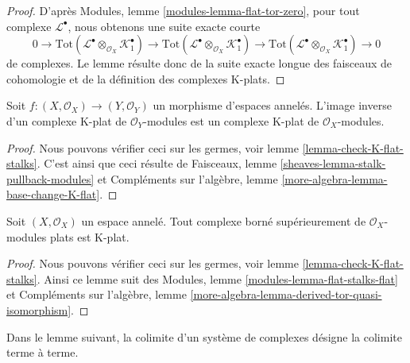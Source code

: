 {\begin{proof}
D'après Modules, lemme \ref{modules-lemma-flat-tor-zero}, pour tout complexe $\mathcal{L}^\bullet$, nous obtenons une suite exacte courte $$
0 \to
\text{Tot}(\mathcal{L}^\bullet \otimes_{\mathcal{O}_X} \mathcal{K}_1^\bullet)
\to
\text{Tot}(\mathcal{L}^\bullet \otimes_{\mathcal{O}_X} \mathcal{K}_1^\bullet)
\to
\text{Tot}(\mathcal{L}^\bullet \otimes_{\mathcal{O}_X} \mathcal{K}_1^\bullet)
\to 0
$$ de complexes. Le lemme résulte donc de la suite exacte longue des faisceaux de cohomologie et de la définition des complexes K-plats.
\end{proof}

\begin{lemma}

\label{lemma-pullback-K-flat}

Soit $f : (X, \mathcal{O}_X) \to (Y, \mathcal{O}_Y)$ un morphisme d'espaces annelés. L'image inverse d'un complexe K-plat de $\mathcal{O}_Y$-modules est un complexe K-plat de $\mathcal{O}_X$-modules.

\end{lemma}

\begin{proof}
Nous pouvons vérifier ceci sur les germes, voir lemme \ref{lemma-check-K-flat-stalks}. C'est ainsi que ceci résulte de Faisceaux, lemme \ref{sheaves-lemma-stalk-pullback-modules} et Compléments sur l'algèbre, lemme \ref{more-algebra-lemma-base-change-K-flat}.
\end{proof}

\begin{lemma}

\label{lemma-bounded-flat-K-flat}
Soit $(X, \mathcal{O}_X)$ un espace annelé. Tout complexe borné supérieurement de $\mathcal{O}_X$-modules plats est K-plat.
\end{lemma}

\begin{proof}
Nous pouvons vérifier ceci sur les germes, voir lemme \ref{lemma-check-K-flat-stalks}. Ainsi ce lemme suit des Modules, lemme \ref{modules-lemma-flat-stalks-flat} et Compléments sur l'algèbre, lemme \ref{more-algebra-lemma-derived-tor-quasi-isomorphism}.
\end{proof}

\noindent
Dans le lemme suivant, la colimite d'un système de complexes désigne la colimite terme à terme.

\begin{lemma}

\label{lemma-colimit-K-flat}


\end{lemma}}
